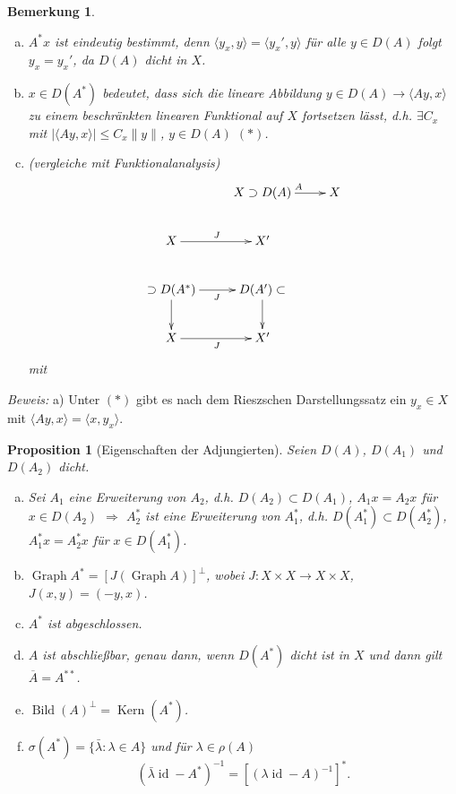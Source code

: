 \documentclass[12pt]{extreport} %
\newtheorem{Bemerkung}[Satz]{Bemerkung}
\newtheorem{Prop}[Satz]{Proposition}
\DeclareMathOperator{\Kern}{Kern}
\DeclareMathOperator{\Bild}{Bild}
\DeclareMathOperator{\id}{id}
\DeclareMathOperator{\Graph}{Graph}
\numberwithin{equation}{section}
\newcommand{\Bew}{\emph{Beweis: }}
\begin{document}
\begin{Bemerkung}
	~
	\begin{enumerate}[a)]
		\item $A^*x$ ist eindeutig bestimmt, denn $\langle y_x,y\rangle = \langle y_x', y\rangle$ für alle $y\in D(A)$ folgt $y_x = y_x'$, da $D(A)$ dicht in $X$. 
		\item $x\in D(A^*)$ bedeutet, dass sich die lineare Abbildung $y\in D(A) \rightarrow \langle Ay,x\rangle$ zu einem beschränkten linearen Funktional auf $X$ fortsetzen lässt, d.h. $\exists C_x$ mit $|\langle Ay, x\rangle|\leq C_x\|y\|$, $y\in D(A)$ $(*)$.
		\item (vergleiche mit Funktionalanalysis)
		$$\xymatrix{
			& X\supset D(A) \ar[r]^A & X \\
			X \ar[r]^J & X'\\
			\supset D(A^*)\ar[r]_J \ar[d]& D(A')\subset\ar[d]\\
			X\ar[r]_J & X'
			}$$
			mit 
	\end{enumerate}
\end{Bemerkung}

\Bew a) Unter $(*)$ gibt es nach dem Rieszschen Darstellungssatz ein $y_x\in X$ mit $\langle Ay, x\rangle = \langle x, y_x\rangle$.  

	
\begin{Prop}[Eigenschaften der Adjungierten]
	Seien $D(A)$, $D(A_1)$ und $D(A_2)$ dicht.
	\begin{enumerate}[a)]
		\item Sei $A_1$ eine Erweiterung von $A_2$, d.h. $D(A_2)\subset D(A_1)$, $A_1 x = A_2x$ für $x\in D(A_2)$ $\Rightarrow$ $A_2^*$ ist eine Erweiterung von $A_1^*$, d.h. $D(A_1^*)\subset D(A_2^*)$, $A_1^*x = A_2^*x$ für $x\in D(A_1^*)$.
		\item $\Graph A^* = [J(\Graph A)]^\perp$, wobei $J\colon X\times X\rightarrow X\times X$, $J(x,y) = (-y,x)$.
		\item $A^*$ ist abgeschlossen.
		\item $A$ ist abschließbar, genau dann, wenn $D(A^*)$ dicht ist in $X$ und dann gilt $\overline{A} = A^{**}$.
		\item $\Bild(A)^\perp = \Kern(A^*)$.
		\item $\sigma(A^*) = \{\bar{\lambda}\colon \lambda\in A \}$ und für $\lambda \in \rho(A)$
		$$(\bar{\lambda} \id - A^*)^{-1} = [(\lambda\id - A)^{-1}]^*.$$
	\end{enumerate}
\end{Prop}
	
\end{document}
